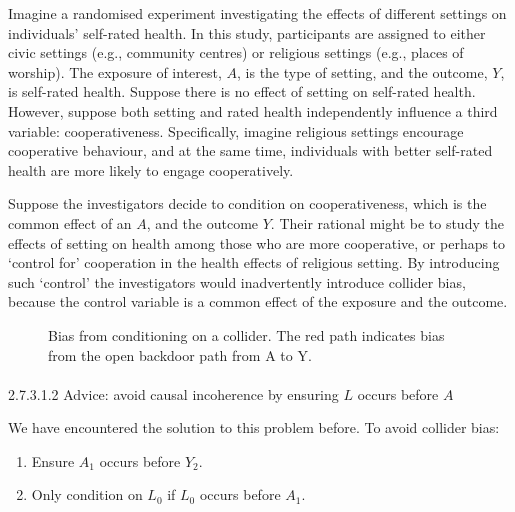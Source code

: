 \documentclass[
  singlecolumn]{article}
\makeatletter
\let\oldparagraph\paragraph
\renewcommand{\paragraph}{
    \@ifstar
      \xxxParagraphStar
      \xxxParagraphNoStar
  }
\newcommand{\xxxParagraphStar}[1]{\oldparagraph*{#1}\mbox{}}
\newcommand{\xxxParagraphNoStar}[1]{\oldparagraph{#1}\mbox{}}
\providecommand{\tightlist}{%
  \setlength{\itemsep}{0pt}\setlength{\parskip}{0pt}}\usepackage{longtable,booktabs,array}
\makeatother
\begin{document}
Imagine a randomised experiment investigating the effects of different
settings on individuals' self-rated health. In this study, participants
are assigned to either civic settings (e.g., community centres) or
religious settings (e.g., places of worship). The exposure of interest,
\(A\), is the type of setting, and the outcome, \(Y\), is self-rated
health. Suppose there is no effect of setting on self-rated health.
However, suppose both setting and rated health independently influence a
third variable: cooperativeness. Specifically, imagine religious
settings encourage cooperative behaviour, and at the same time,
individuals with better self-rated health are more likely to engage
cooperatively.

Suppose the investigators decide to condition on cooperativeness, which
is the common effect of an \(A\), and the outcome \(Y\). Their rational
might be to study the effects of setting on health among those who are
more cooperative, or perhaps to `control for' cooperation in the health
effects of religious setting. By introducing such `control' the
investigators would inadvertently introduce collider bias, because the
control variable is a common effect of the exposure and the outcome.

\begin{figure}


\caption{\label{fig-dag-common-effect}Bias from conditioning on a
collider. The red path indicates bias from the open backdoor path from A
to Y.}

\end{figure}%

\paragraph{\texorpdfstring{2.7.3.1.2 Advice: avoid causal incoherence by
ensuring \(L\) occurs before
\(A\)}{2.7.3.1.2 Advice: avoid causal incoherence by ensuring L occurs before A}}\label{advice-avoid-causal-incoherence-by-ensuring-l-occurs-before-a-2}

We have encountered the solution to this problem before. To avoid
collider bias:

\begin{enumerate}
\def\labelenumi{\arabic{enumi}.}
\tightlist
\item
  Ensure \(A_1\) occurs before \(Y_2\).
\item
  Only condition on \(L_0\) if \(L_0\) occurs before \(A_1\).
\end{enumerate}
\end{document}
